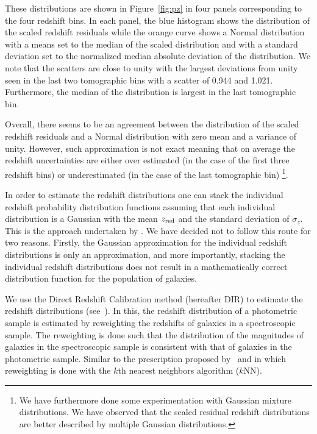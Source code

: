 \documentclass[fleqn,usenatbib,useAMS]{mnras}
\begin{document}
These distributions are shown in Figure~\ref{fig:pz} in four panels corresponding to the four redshift bins. In each panel, the blue histogram shows the distribution of the scaled redshift residuals while the orange curve shows a Normal distribution with a means set to the median of the scaled distribution and with a standard deviation set to the normalized median absolute deviation of the distribution. We note that the scatters are close to unity with the largest deviations from unity seen in the last two tomographic bins with a scatter of 0.944 and 1.021. Furthermore, the median of the distribution is largest in the last tomographic bin.

Overall, there seems to be an agreement between the distribution of the scaled redshift residuals and a Normal distribution with zero mean and a variance of unity. However, such approximation is not exact meaning that on average the redshift uncertainties are either over estimated (in the case of the first three redshift bins) or underestimated (in the case of the last tomographic bin) \footnote{We have furthermore done some experimentation with Gaussian mixture distributions. We have observed that the scaled residual redshift distributions are better described by multiple Gaussian distributions.}. 

In order to estimate the redshift distributions one can stack the individual redshift probability distribution functions assuming that each individual distribution is a Gaussian with the mean $z_{\rm red}$ and the standard deviation of $\sigma_{z}$. This is the approach undertaken by \citet{elvin2017}. We have decided not to follow this route for two reasons. Firstly, the Gaussian approximation for the individual redshift distributions is only an approximation, and more importantly, stacking the individual redshift distributions does not result in a mathematically correct distribution function for the population of galaxies. 

We use the Direct Redshift Calibration method (hereafter DIR) to estimate the redshift distributions (see~\citealt{lima2008, cunha2009}). In this, the redshift distribution of a photometric sample is estimated by reweighting the redshifts of galaxies in a spectroscopic sample. The reweighting is done such that the distribution of the magnitudes of galaxies in the spectroscopic sample is consistent with that of galaxies in the photometric sample. Similar to the prescription proposed by~\citet{cunha2009} and \citet{hendrik2018} in which reweighting is done with the $k$th nearest neighbors algorithm ($k$NN). 
\end{document}
